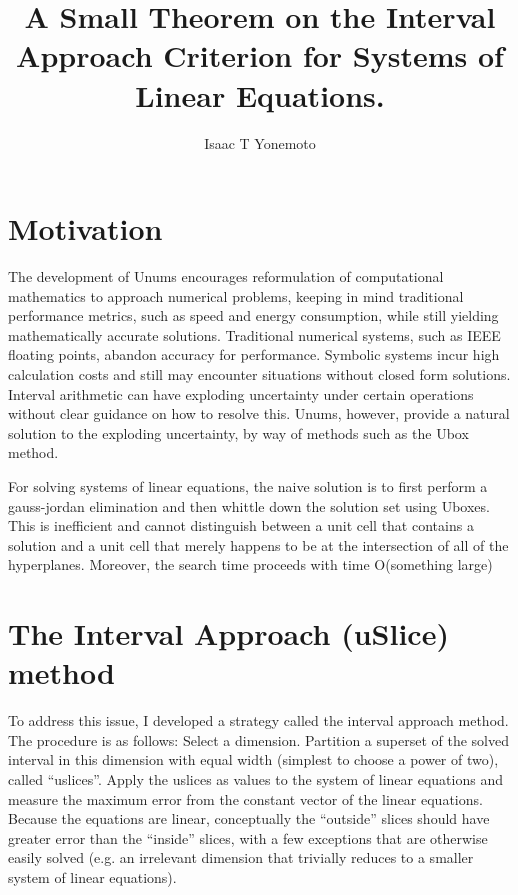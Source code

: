 \documentclass[a4paper,10pt]{article}
\title{A Small Theorem on the Interval Approach Criterion for Systems of Linear Equations.}
\author{Isaac T Yonemoto}
\begin{document}
\maketitle

\section{Motivation}

The development of Unums encourages reformulation of computational mathematics to approach
numerical problems, keeping in mind traditional performance metrics, such as speed and energy
consumption, while still yielding mathematically accurate solutions.  Traditional numerical
systems, such as IEEE floating points, abandon accuracy for performance.  Symbolic systems
incur high calculation costs and still may encounter situations without closed form solutions.
Interval arithmetic can have exploding uncertainty under certain operations without clear
guidance on how to resolve this.  Unums, however, provide a natural solution to the exploding
uncertainty, by way of methods such as the Ubox method.

For solving systems of linear equations, the naive solution is to first perform a gauss-jordan
elimination and then whittle down the solution set using Uboxes.  This is inefficient and cannot
distinguish between a unit cell that contains a solution and a unit cell that merely happens to
be at the intersection of all of the hyperplanes.  Moreover, the search time proceeds with time
O(something large)

\section{The Interval Approach (uSlice) method}

To address this issue, I developed a strategy called the interval approach method.  The procedure
is as follows:  Select a dimension.  Partition a superset of the solved interval in this dimension 
with equal width (simplest to choose a power of two), called ``uslices''.  Apply the uslices as
values to the system of linear equations and measure the maximum error from the constant vector of the
linear equations.  Because the equations are linear, conceptually the ``outside'' slices should 
have greater error than the ``inside'' slices, with a few exceptions that are otherwise easily 
solved (e.g. an irrelevant dimension that trivially reduces to a smaller system of linear equations).
\end{document}

